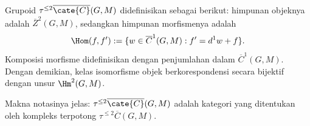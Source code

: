 \begin{definition}
	Grupoid $\tau^{\leq2}\overline{\cate{C}}(G,M)$ didefinisikan sebagai
	berikut: himpunan objeknya adalah $\overline{Z}^2(G,M)$, sedangkan himpunan
	morfismenya adalah
	\[ \Hom(f,f'):=\{w\in\overline{C}^1(G,M):f'=d^1w+f\}. \]
	Komposisi morfisme didefinisikan dengan penjumlahan dalam
	$\overline{C}^1(G,M)$. Dengan demikian, kelas isomorfisme objek berkorespondensi
	secara bijektif dengan unsur $\Hm^2(G,M)$.
\end{definition}

Makna notasinya jelas: $\tau^{\leq2}\overline{\cate{C}}(G,M)$ adalah
kategori yang ditentukan oleh kompleks terpotong
$\tau^{\leq2}\overline{C}(G,M)$.

